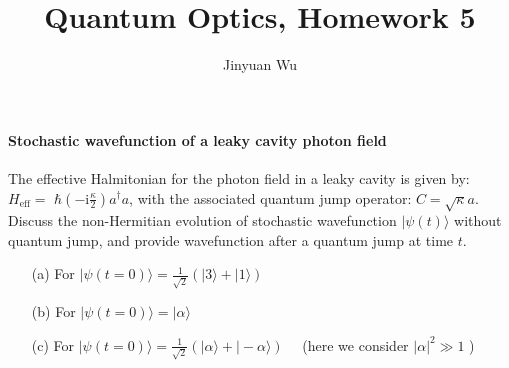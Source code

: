 \documentclass[hyperref, a4paper]{article}
\title{Quantum Optics, Homework 5}
\author{Jinyuan Wu}
\newcommand*{\ii}{\mathrm{i}}
\begin{document}
\maketitle

\paragraph{Stochastic wavefunction of a leaky cavity photon field} The effective Halmitonian for the photon field in a leaky cavity is given by: $H_\text{eff}=$ $\hbar\left(- \ii \frac{\kappa}{2}\right) a^{\dagger} a$, with the associated quantum jump operator: ${C}=\sqrt{\kappa} {a}$.
Discuss the non-Hermitian evolution of stochastic wavefunction $|\psi({t})\rangle$ without quantum jump, and provide wavefunction after a quantum jump at time $t$.
\begin{itemize}
\item[(a)] For $|\psi({t}=0)\rangle=\frac{1}{\sqrt{2}}(|3\rangle+|1\rangle)$
\item[(b)] For $|\psi({t}=0)\rangle=|\alpha\rangle$
\item[(c)] For $|\psi({t}=0)\rangle=\frac{1}{\sqrt{2}}(|\alpha\rangle+|-\alpha\rangle) \quad$ (here we consider $|\alpha|^{2} \gg 1$ )
\end{itemize}
\end{document}
